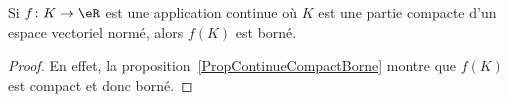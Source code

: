 \begin{corollary}	\label{CorFnContinueCompactBorne}
	Si \( f\colon K\to \eR\) est une application continue où \( K\) est une partie compacte d'un espace vectoriel normé, alors \( f(K)\) est borné.
\end{corollary}

\begin{proof}
	En effet, la proposition~\ref{PropContinueCompactBorne} montre que \( f(K)\) est compact et donc borné.
\end{proof}



